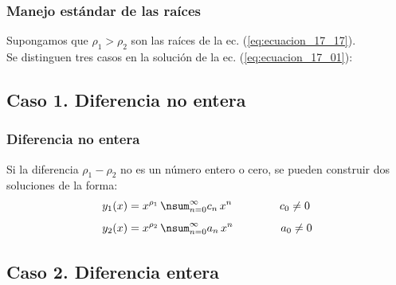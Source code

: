 \documentclass[12pt]{beamer}
\begin{document}
\begin{frame}
\frametitle{Manejo estándar de las raíces}
Supongamos que $\rho_{1} > \rho_{2}$ son las raíces de la ec. (\ref{eq:ecuacion_17_17}).
\\
\bigskip
\pause
Se distinguen tres casos en la solución de la ec. (\ref{eq:ecuacion_17_01}):
\end{frame}

\subsection{Caso 1. Diferencia no entera}\label{caso1}

\begin{frame}
\frametitle{Diferencia no entera}
Si la diferencia $\rho_{1} - \rho_{2}$ no es un número entero o cero, se pueden construir dos soluciones de la forma:
\pause
\begin{align*}
y_{1}(x) &= x^{\rho_{1}} \, \nsum_{n=0}^{\infty} c_{n} \, x^{n} \hspace{1.5cm} c_{0} \neq 0 \\[0.5em]
y_{2}(x) &= x^{\rho_{2}} \, \nsum_{n=0}^{\infty} a_{n} \, x^{n} \hspace{1.5cm} a_{0} \neq 0
\end{align*}
\end{frame}

\subsection{Caso 2. Diferencia entera} \label{caso2}
\end{document}
